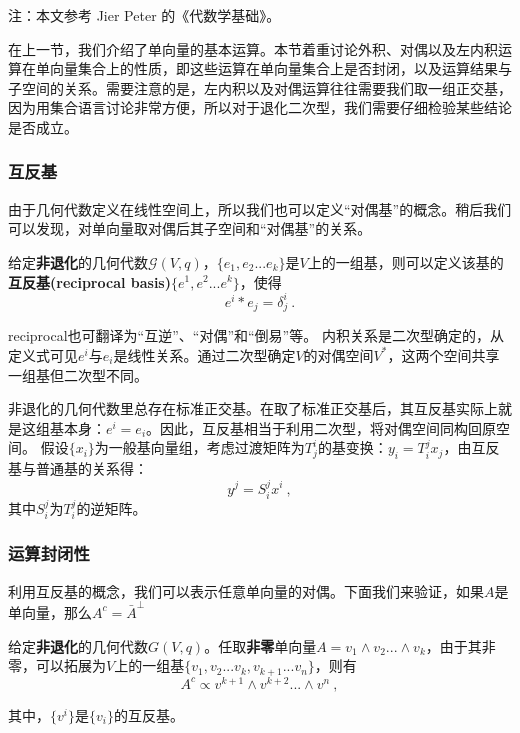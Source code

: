 

\begin{issues}
\issueTODO
\end{issues}


注：本文参考 Jier Peter 的《代数学基础》。

在上一节，我们介绍了单向量的基本运算。本节着重讨论外积、对偶以及左内积运算在单向量集合上的性质，即这些运算在单向量集合上是否封闭，以及运算结果与子空间的关系。需要注意的是，左内积以及对偶运算往往需要我们取一组正交基，因为用集合语言讨论非常方便，所以对于退化二次型，我们需要仔细检验某些结论是否成立。
\subsubsection{互反基}
由于几何代数定义在线性空间上，所以我们也可以定义“对偶基”的概念。稍后我们可以发现，对单向量取对偶后其子空间和“对偶基”的关系。

\begin{definition}{}
给定\textbf{非退化}的几何代数$\mathcal G(V,q)$，$\{e_1,e_2...e_k\}$是$V$上的一组基，则可以定义该基的\textbf{互反基(reciprocal basis)}$\{e^1,e^2...e^k\}$，使得
\begin{equation}
e^i*e_j=\delta^i_j~.
\end{equation}
\end{definition}
reciprocal也可翻译为“互逆”、“对偶”和“倒易”等。
内积关系是二次型确定的，从定义式可见$e^i$与$e_i$是线性关系。通过二次型确定$V$的对偶空间$V^*$，这两个空间共享一组基但二次型不同。

非退化的几何代数里总存在标准正交基。在取了标准正交基后，其互反基实际上就是这组基本身：$e^i=e_i$。因此，互反基相当于利用二次型，将对偶空间同构回原空间。
假设$\{x_i\}$为一般基向量组，考虑过渡矩阵为$T^i_j$的基变换：$y_i=T^j_ix_j$，由互反基与普通基的关系得：
\begin{equation}
y^j=S^j_ix^i~,
\end{equation}
其中$S^j_i$为$T^j_i$的逆矩阵。

\subsubsection{运算封闭性}
利用互反基的概念，我们可以表示任意单向量的对偶。下面我们来验证，如果$A$是单向量，那么$A^c=\bar A^{\perp}$
\begin{theorem}{}\label{the_Clf05_1}
给定\textbf{非退化}的几何代数$G(V,q)$。任取\textbf{非零}单向量$A=v_1\wedge v_2...\wedge v_k$，由于其非零，可以拓展为$V$上的一组基$\{v_1,v_2...v_k,v_{k+1}...v_n\}$，则有
\begin{equation}
A^c\propto v^{k+1}\wedge v^{k+2}...\wedge v^n~,
\end{equation}
\end{theorem}
其中，$\{v^i\}$是$\{v_i\}$的互反基。

